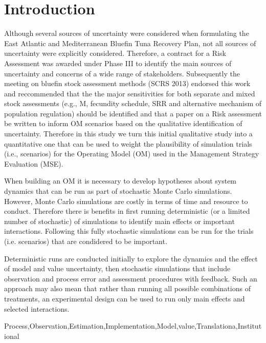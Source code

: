\documentclass[a4paper,10pt]{article}
\title{}
\begin{document}
\maketitle

\section*{Introduction}

Although several sources of uncertainty were considered when formulating the East Atlantic and 
Mediterranean Bluefin Tuna Recovery Plan, not all sources of uncertainty were explicitly considered. 
Therefore, a contract for a Risk Assessment was awarded under Phase III to identify the main 
sources of uncertainty and concerns of a wide range of stakeholders. 
Subsequently the meeting on bluefin stock assessment methods (SCRS 2013) endorsed this work and
reccommended that the the major sensitivities for both separate and mixed stock assessments (e.g., M, fecundity
schedule, SRR and alternative mechanism of population regulation) should be identified and that
a paper on a Risk assessment be written to inform OM scenarios based on the qualitative identification 
of uncertainty. Therefore in this study we turn this 
initial qualitative study into a quantitative one that can be used to weight the 
plausibility of simulation trials (i.e., scenarios) for the Operating Model (OM) used 
in the Management Strategy Evaluation (MSE).

When building an OM it is necessary to develop hypotheses about system dynamics that can be
run as part of stochastic Monte Carlo simulations. However, Monte Carlo simulations are costly 
in terms of time and resource to conduct. Therefore there is benefits in first running deterministic 
(or a limited number of stochastic) of simulations to identify main effects or important interactions. 
Following this fully stochastic simulations can be run for the trials (i.e. scenarios) that
are condidered to be important. 

Deterministic runs are conducted initially to explore the dynamics and the effect of model and value 
uncertainty, then stochastic simulations that include observation and process error and assessment 
procedures with feedback. Such an approach may also mean that rather than running all possible combinations 
of treatments, an experimental design can be used to run only main effects and selected interactions.


Process,Observation,Estimation,Implementation,Model,value,Translationa,Institutional
\end{document}
